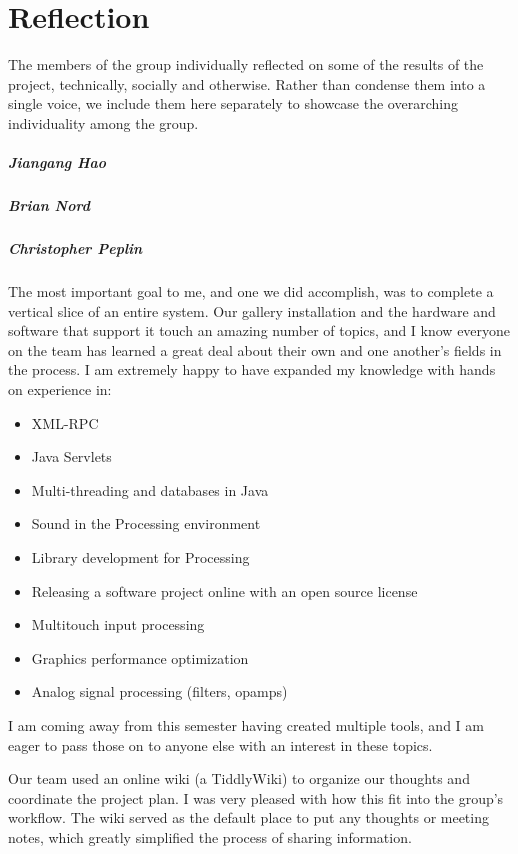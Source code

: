 \chapter{Reflection}
The members of the group individually reflected on some of the results of the project, technically, socially and otherwise.  Rather than condense them into a single voice, we include them here separately to showcase the overarching individuality among the group. 

\paragraph{Jiangang Hao}

\paragraph{Brian Nord}

\paragraph{Christopher Peplin}
The most important goal to me, and one we did accomplish, was to complete a vertical slice of an entire system. Our gallery installation and the hardware and software that support it touch an amazing number of topics, and I know everyone on the team has learned a great deal about their own and one another's fields in the process. I am extremely happy to have expanded my knowledge with hands on experience in:
\begin{itemize}
\item XML-RPC
\item Java Servlets
\item Multi-threading and databases in Java
\item Sound in the Processing environment
\item Library development for Processing
\item Releasing a software project online with an open source license
\item Multitouch input processing
\item Graphics performance optimization
\item Analog signal processing (filters, opamps)
\end{itemize}
I am coming away from this semester having created multiple tools, and I am eager to pass those on to anyone else with an interest in these topics. 


Our team used an online wiki (a TiddlyWiki) \cite{WIKI} to organize our thoughts and coordinate the project plan. I was very pleased with how this fit into the group's workflow. The wiki served as the default place to put any thoughts or meeting notes, which greatly simplified the process of sharing information.

